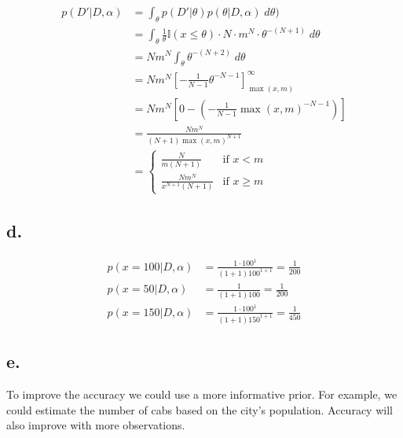 \documentclass{article}
\begin{document}
\begin{align*}
  p(D'|D,\alpha) &= \int_\theta p(D'|\theta) p(\theta|D,\alpha) \;
                   d\theta) \\
                 &= \int_\theta \frac{1}{\theta} \mathbb{I}(x \le
                   \theta) \cdot N \cdot m^N \cdot \theta^{-(N+1)} \;
                   d\theta \\
                 &= Nm^N \int_\theta \theta^{-(N+2)} \; d\theta \\
                 &= Nm^N \left[ -\frac{1}{N-1} \theta^{-N-1}
                   \right]_{\max(x,m)}^\infty \\
                 &= Nm^N \left[ 0 - \left( -\frac{1}{N-1}
                   \max(x,m)^{-N-1} \right) \right] \\
                 &= \frac{Nm^N}{(N+1)\max(x,m)^{N+1}} \\
                 &= \left\{ \begin{array}{ll}
                              \frac{N}{m(N+1)} & \mbox{if $x < m$} \\
                              \frac{Nm^N}{x^{N+1}(N+1)} & \mbox{if $x
                                                          \ge m$}
                            \end{array} \right.
\end{align*}

\subsection{d.}

\begin{equation*}
  \begin{split}
    p(x = 100|D,\alpha) &= \frac{1 \cdot 100^1}{(1+1)100^{1+1}} =
    \frac{1}{200} \\
    p(x = 50|D,\alpha) &= \frac{1}{(1+1)100} = \frac{1}{200} \\
    p(x = 150|D,\alpha) &= \frac{1 \cdot 100^1}{(1+1)150^{1+1}} =
    \frac{1}{450}
  \end{split}
\end{equation*}

\subsection{e.}
To improve the accuracy we could use a more informative prior. For
example, we could estimate the number of cabs based on the city's
population. Accuracy will also improve with more observations.
\end{document}
